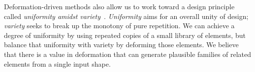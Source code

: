 Deformation-driven methods also allow us to work toward a design principle called \textit{uniformity amidst variety}~\cite{Hutcheson1729, Gombrich}. 
\textit{Uniformity} aims for an overall unity of design; 
\textit{variety} seeks to break up the monotony of
pure repetition.
We can achieve a degree of uniformity by using repeated copies of a small library of elements, but balance that uniformity with
variety by deforming those elements. 
We believe that there is a value in deformation that can generate plausible families of related elements from a single input shape.


